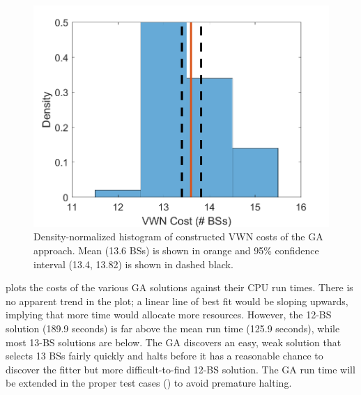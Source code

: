 \documentclass[12pt,dvipsnames]{report}
\begin{document}
\begin{figure}[htp]
	\centering
	\includegraphics[height=0.4\textheight]{Figures/Prelim_GACostsPDF}
	\caption[GA approach VWN cost trend for the preliminary simulations]{Density-normalized histogram of constructed VWN costs of the GA approach.  Mean (13.6 BSs) is shown in orange and 95\% confidence interval (13.4, 13.82) is shown in dashed black.}
	\label{fig:Prelim_GACostsPDF}
\end{figure}

 plots the costs of the various GA solutions against their CPU run times.  There is no apparent trend in the plot; a linear line of best fit would be sloping upwards, implying that more time would allocate more resources.  However, the 12-BS solution (189.9 seconds) is far above the mean run time (125.9 seconds), while most 13-BS solutions are below.  The GA discovers an easy, weak solution that selects 13 BSs fairly quickly and halts before it has a reasonable chance to discover the fitter but more difficult-to-find 12-BS solution.  The GA run time will be extended in the proper test cases () to avoid premature halting.
\end{document}
